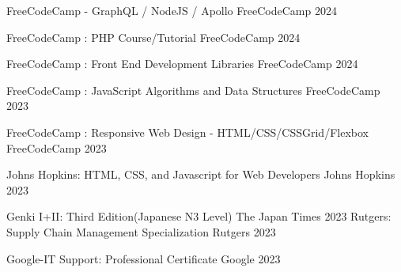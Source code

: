 

\begin{cvhonors}

  \cvhonor
    {FreeCodeCamp - GraphQL / NodeJS / Apollo} %
    {FreeCodeCamp} %
    {} %
    {2024} %

  \cvhonor
    {FreeCodeCamp : PHP Course/Tutorial} %
    {FreeCodeCamp} %
    {} %
    {2024} %

  \cvhonor
    {FreeCodeCamp : Front End Development Libraries} %
    {FreeCodeCamp} %
    {} %
    {2024} %

  \cvhonor
    {FreeCodeCamp : JavaScript Algorithms and Data Structures} %
    {FreeCodeCamp} %
    {} %
    {2023} %

  \cvhonor
    {FreeCodeCamp : Responsive Web Design - HTML/CSS/CSSGrid/Flexbox} %
    {FreeCodeCamp} %
    {} %
    {2023} %

  \cvhonor
    {Johns Hopkins: HTML, CSS, and Javascript for Web Developers} %
    {Johns Hopkins} %
    {} %
    {2023} %

  \cvhonor
  {Genki I+II: Third Edition(Japanese N3 Level)} %
  { The Japan Times} %
  {} %
  {2023} %
\cvhonor
{Rutgers: Supply Chain Management Specialization} %
{Rutgers} %
{} %
{2023} %

\cvhonor
{Google-IT Support: Professional Certificate} %
{Google} %
{} %
{2023} %


\end{cvhonors}
